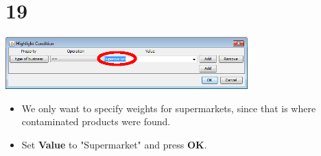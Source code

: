 \documentclass[10pt]{beamer}
\begin{document}
\section{19}
\begin{frame}
	\begin{center}
  		\includegraphics[width=0.7\textwidth]{19.png}
	\end{center}
	\begin{itemize}
		\item We only want to specify weights for supermarkets, since that is where contaminated products were found.
		\item Set \textbf{Value} to "Supermarket" and press \textbf{OK}.
	\end{itemize}
\end{frame}

\end{document}
